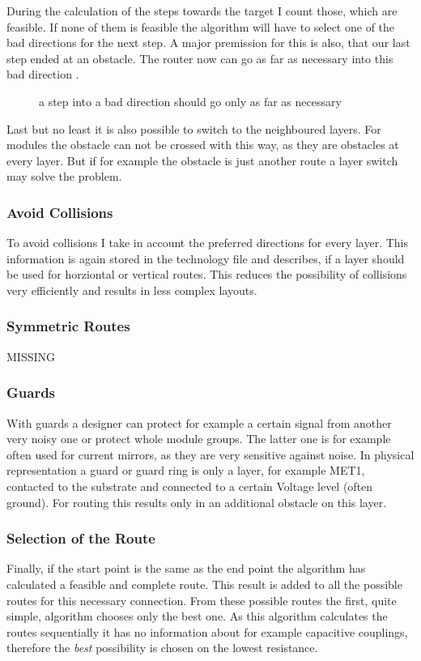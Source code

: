 During the calculation of the steps towards the target I count those, which are feasible. If none of them is feasible the algorithm will have to select one of the bad directions for the next step. A major premission for this is also, that our last step ended at an obstacle. The router now can go as far as necessary into this bad direction .

\begin{figure}
	\centering
	
 	\caption{a step into a bad direction should go only as far as necessary}
	\label{fig:router_as_far_as_necessary}
\end{figure}

Last but no least it is also possible to switch to the neighboured layers. For modules the obstacle can not be crossed with this way, as they are obstacles at every layer. But if for example the obstacle is just another route a layer switch may solve the problem.

\subsubsection{Avoid Collisions}
To avoid collisions I take in account the preferred directions for every layer. This information is again stored in the technology file and describes, if a layer should be used for horziontal or vertical routes. This reduces the possibility of collisions very efficiently and results in less complex layouts.

\subsubsection{Symmetric Routes}
MISSING

\subsubsection{Guards}
With guards a designer can protect for example a certain signal from another very noisy one or protect whole module groups. The latter one is for example often used for current mirrors, as they are very sensitive against noise. In physical representation a guard or guard ring is only a layer, for example MET1, contacted to the substrate and connected to a certain Voltage level (often ground). For routing this results only in an additional obstacle on this layer.

\subsubsection{Selection of the Route}
Finally, if the start point is the same as the end point the algorithm has calculated a feasible and complete route. This result is added to all the possible routes for this necessary connection. From these possible routes the first, quite simple, algorithm chooses only the best one. As this algorithm calculates the routes sequentially it has no information about for example capacitive couplings, therefore the \textit{best} possibility is chosen on the lowest resistance.

